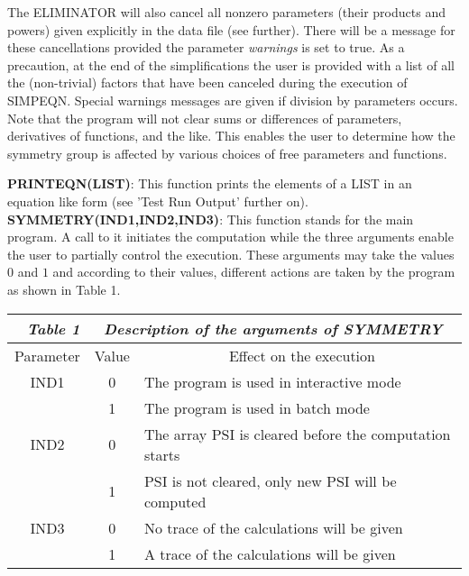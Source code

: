 {\begin{enumerate}
\nopagebreak
The ELIMINATOR will also cancel all nonzero parameters 
(their products and powers)
given explicitly in the data file (see further). 
There will be a message for these
cancellations provided the parameter {\em warnings} is set to true. 
As a precaution, at the end of the simplifications the user is 
provided with a list of all the (non-trivial) factors that have been canceled 
during the execution of SIMPEQN. 
Special warnings messages are given if division
by parameters occurs. Note that the program will not clear sums or
differences of parameters, derivatives of functions, and the like.
This enables the user to determine how the symmetry group is affected by 
various choices of free parameters and functions.
\end{enumerate}
\nopagebreak
\phantom{junk junk junk junk}
\vskip 1pt
\indent
{\bf PRINTEQN(LIST)}: This function prints the elements of a LIST in
an equation like form (see 'Test Run Output' further on).
\nopagebreak
\vskip 2pt
\noindent
{\bf SYMMETRY(IND1,IND2,IND3)}: This function stands
for the main program. A call to it initiates the computation while
the three arguments enable the user to partially control the execution.
These arguments may take the values $0$ and $1$ and according to their values,
different actions are taken by the program as shown in Table 1.

\begin{center}
\begin{tabular}{||c|c|l||} \hline \hline
\multicolumn{3}{||c||}{\em Table 1 $\;\;\;$ Description of 
the arguments of SYMMETRY}  \\ \hline
Parameter &  Value & $\;\;\;\;\;\;\;\;\;\;\;\;\;\;\;\;\;\;\;\;$ 
Effect on the execution \\ \hline \hline 
IND1 & 0 & The program is used in interactive mode   \\ \hline
   & 1 & The program is used in batch mode   \\ \hline \hline
IND2 & 0 &The array PSI is cleared before the computation starts \\ \hline
   & 1 & PSI is not cleared, only new PSI will be computed \\ \hline \hline
IND3 & 0 & No trace of the calculations will be given\\ \hline
   & 1 & A trace of the calculations will be given  \\ \hline \hline
\end{tabular}
\end{center}

}
